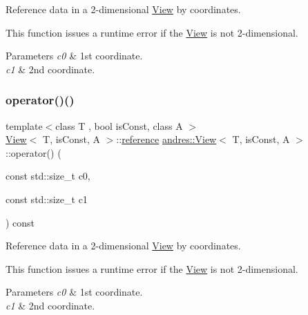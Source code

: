 Reference data in a 2-\/dimensional \hyperlink{classandres_1_1View}{View} by coordinates.

This function issues a runtime error if the \hyperlink{classandres_1_1View}{View} is not 2-\/dimensional.


\begin{DoxyParams}{Parameters}
{\em c0} & 1st coordinate. \\
\hline
{\em c1} & 2nd coordinate. \\
\hline
\end{DoxyParams}
\mbox{\label{classandres_1_1View_a08a9d2bb8fd2cb210ef328d5ce9e2e3d}} 
\subsubsection{\texorpdfstring{operator()()}{operator()()}\hspace{0.1cm}{\footnotesize\ttfamily [4/12]}}
{\footnotesize\ttfamily template$<$class T , bool is\+Const, class A $>$ \\
\hyperlink{classandres_1_1View}{View}$<$ T, is\+Const, A $>$\+::\hyperlink{classandres_1_1View_aebdd1f19272b743b4422ff8ba18fc11a}{reference} \hyperlink{classandres_1_1View}{andres\+::\+View}$<$ T, is\+Const, A $>$\+::operator() (\begin{DoxyParamCaption}\item[{const std\+::size\+\_\+t}]{c0,  }\item[{const std\+::size\+\_\+t}]{c1 }\end{DoxyParamCaption}) const\hspace{0.3cm}{\ttfamily [inline]}}

Reference data in a 2-\/dimensional \hyperlink{classandres_1_1View}{View} by coordinates.

This function issues a runtime error if the \hyperlink{classandres_1_1View}{View} is not 2-\/dimensional.


\begin{DoxyParams}{Parameters}
{\em c0} & 1st coordinate. \\
\hline
{\em c1} & 2nd coordinate. \\
\hline
\end{DoxyParams}
\mbox{\label{classandres_1_1View_a46b12868d2aa22f89f65d604885dc1eb}} 
